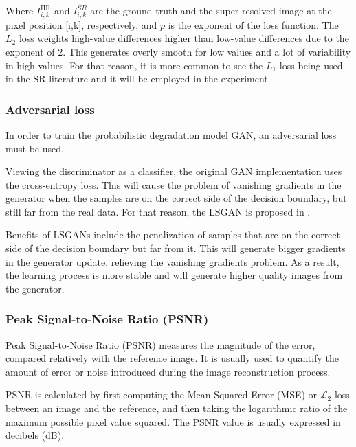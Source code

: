            Where $I^{\text{HR}}_{i,k}$ and $I^{SR}_{i,k}$ are the ground truth and the super resolved image at the pixel position [i,k], respectively, and $p$ is the exponent of the loss function. 
            The $L_2$ loss weights high-value differences higher than low-value differences due to the exponent of 2. 
            This generates overly smooth for low values and a lot of variability in high values. 
            For that reason, it is more common to see the $L_1$ loss being used in the SR literature and it will be employed in the experiment.

        \subsubsection{Adversarial loss}

        In order to train the probabilistic degradation model GAN, an adversarial loss must be used. 

        Viewing the discriminator as a classifier, the original GAN implementation uses the cross-entropy loss. This will cause the problem of vanishing gradients in the generator when the samples are on the correct side of the decision boundary, but still far from the real data. For that reason, the LSGAN is proposed in \cite{mao2017squares}. 
        
        Benefits of LSGANs include the penalization of samples that are on the correct side of the decision boundary but far from it. This will generate bigger gradients in the generator update, relieving the vanishing gradients problem. As a result, the learning process is more stable and will generate higher quality images from the generator.

        

        \subsubsection{Peak Signal-to-Noise Ratio (PSNR)}

         
            Peak Signal-to-Noise Ratio (PSNR) measures the magnitude of the error, compared relatively with the reference image. It is usually used to quantify the amount of error or noise introduced during the image reconstruction process.
            
            PSNR is calculated by first computing the Mean Squared Error (MSE) or $\mathcal{L}_2$ loss between an image and the reference, and then taking the logarithmic ratio of the maximum possible pixel value squared. The PSNR value is usually expressed in decibels (dB).
            
